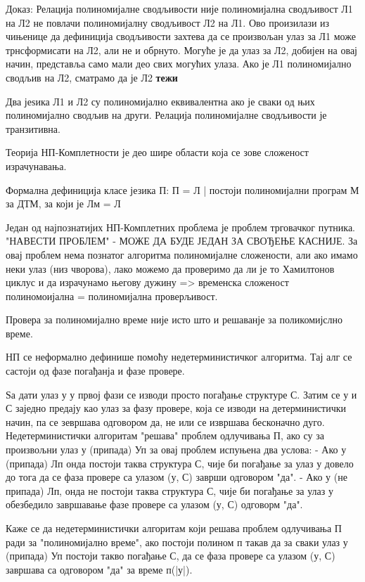 \documentclass[12pt,oneside]{memoir}
\begin{document}
Доказ: Релација полиномијалне сводљивости није полиномијална сводљивост Л1 на Л2 не повлачи полиномијалну сводљивост Л2 на Л1. Ово произилази из чињенице
да дефиниција сводљивости захтева да се произвољан улаз за Л1 може трнсформисати на Л2, али не и обрнуто. Могуће је да улаз за Л2, добијен на овај начин, представља само мали део свих могућих улаза. Ако је Л1 полиномијално сводљив на Л2, сматрамо да је Л2 \textbf{тежи}

Два јеѕика Л1 и Л2 су полиномијално еквивалентна ако је сваки од њих полиномијално сводљив на други.
Релација полиномијалне сводљивости је транзитивна.

Теорија НП-Комплетности је део шире области која се зове сложеност израчунавања.

Формална дефиниција класе језика П:
П = {Л | постоји полиномијални програм М за ДТМ, за који је Лм = Л }

Један од најпознатијих НП-Комплетних проблема је проблем трговачког путника. "НАВЕСТИ ПРОБЛЕМ" - МОЖЕ ДА БУДЕ ЈЕДАН ЗА СВОЂЕЊЕ КАСНИЈЕ.
За овај проблем нема познатог алгоритма полиномијалне сложености, али ако имамо неки улаз (низ чворова), лако можемо да проверимо да ли је то Хамилтонов циклус и да израчунамо његову дужину => временска сложеност полиномоијална = полиномијална проверљивост.

Провера за полиномијално време није исто што и решаванје за поликомијслно време. 

НП се неформално дефинише помоћу недетерминистичког алгоритма. Тај алг се састоји од фазе погађанја и фазе провере.

Ѕа дати улаз у у првој фази се изводи просто погађање структуре С. Затим се у и С заједно предају као улаз за фазу провере, која се изводи на детерминистички начин, па се зевршава одговором да, не или се извршава бесконачно дуго.
Недетерминистички алгоритам "решава" проблем одлучивања П, ако су за произвољни улаз у (припада) Уп за овај проблем испуњена два услова:
- Ако у (припада) Лп онда постоји таква структура С, чије би погађање за улаз у довело до тога да се фаза провере са улазом (у, С) заврши одговором "да".
- Ако у (не припада) Лп, онда не постоји таква структура С, чије би погађање за улаз у обезбедило завршавање фазе провере са улазом (у, С) одговорм "да".

Каже се да недетерминистички алгоритам који решава проблем одлучивања П ради за "полиномијално време", ако постоји полином п такав да за сваки улаз у (припада) Уп постоји такво погађање С, да се фаза провере са улазом (у, С) завршава са одговором "да" за време п(|у|).
\end{document}
